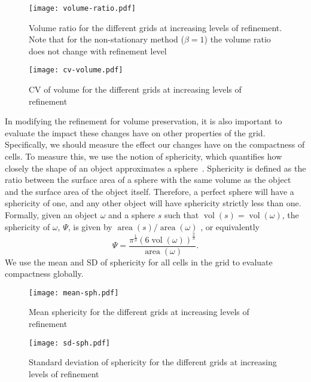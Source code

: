 \begin{figure}[htp!]
	\centering
	\texttt{[image: volume-ratio.pdf]}
	\caption[Title]{
		Volume ratio for the different grids at increasing levels of refinement.
		Note that for the non-stationary method ($\beta = 1$) the volume ratio does not change with refinement level
	}
	\label{fig:vr}
\end{figure}



\begin{figure}[htp!]
	\centering
	\texttt{[image: cv-volume.pdf]}
	\caption[Title]{
		CV of volume for the different grids at increasing levels of refinement
	}
	\label{fig:cv}
\end{figure}


In modifying the refinement for volume preservation, it is also important to evaluate the impact these changes have on other properties of the grid.
Specifically, we should measure the effect our changes have on the compactness of cells.
To measure this, we use the notion of sphericity, which quantifies how closely the shape of an object approximates a sphere~\cite{wadell1935volume}.
Sphericity is defined as the ratio between the surface area of a sphere with the same volume as the object and the surface area of the object itself.
Therefore, a perfect sphere will have a sphericity of one, and any other object will have sphericity strictly less than one.
Formally, given an object $\omega$ and a sphere $s$ such that $\operatorname{vol}(s) = \operatorname{vol}(\omega)$, the sphericity of $\omega$, $\Psi$, is given by $\operatorname{area}(s) / \operatorname{area}(\omega)$ , or equivalently 
%
\begin{equation*}
\Psi = \frac{\pi^{\frac{1}{3}}\left( 6\operatorname{vol}(\omega) \right)^{\frac{2}{3}}}{\operatorname{area}(\omega)}.
\end{equation*}
%
We use the mean and SD of sphericity for all cells in the grid to evaluate compactness globally.


\begin{figure}[htp!]
	\centering
	\texttt{[image: mean-sph.pdf]}
	\caption[Title]{
		Mean sphericity for the different grids at increasing levels of refinement
	}
	\label{fig:sph}
\end{figure}


\begin{figure}[htp!]
	\centering
	\texttt{[image: sd-sph.pdf]}
	\caption[Title]{
		Standard deviation of sphericity for the different grids at increasing levels of refinement
	}
	\label{fig:sd-sph}
\end{figure}


